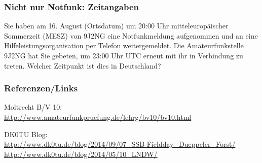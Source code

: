 \begin{frame}
    \frametitle{Nicht nur Notfunk: Zeitangaben}

    \begin{exampleblock}{
        Sie haben am 16. August (Ortsdatum) um 20:00 Uhr mitteleuropäischer
        Sommerzeit (MESZ) von 9J2NG eine Notfunkmeldung aufgenommen und an eine
        Hilfeleistungsorganisation per Telefon weitergemeldet. Die Amateurfunkstelle
        9J2NG hat Sie gebeten, um 23:00 Uhr UTC erneut mit ihr in Verbindung zu
        treten. Welcher Zeitpunkt ist dies in Deutschland?}
    \end{exampleblock}

\end{frame}

\renewcommand{\refname}{Referenzen}

\begin{frame}
    \frametitle{Referenzen/Links}
    \hypertarget{refs}{}
    \footnotesize

    \begin{thebibliography}{}
         Moltrecht B/V 10: \\
                        \url{http://www.amateurfunkpruefung.de/lehrg/bv10/bv10.html}

          DK0TU Blog: \\
                        \url{http://www.dk0tu.de/blog/2014/09/07_SSB-Fieldday_Dueppeler_Forst/}
                        \url{http://www.dk0tu.de/blog/2014/05/10_LNDW/}
    \end{thebibliography} 
   
\end{frame}


